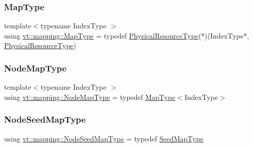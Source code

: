 \subsubsection{\texorpdfstring{Map\+Type}{MapType}}
{\footnotesize\ttfamily template$<$typename Index\+Type $>$ \\
using \hyperlink{namespacevt_1_1mapping_a443f8bb8920af5ae1d3391f61fe492a6}{vt\+::mapping\+::\+Map\+Type} = typedef \hyperlink{namespacevt_a2dc36fcada816dc6d11774d650328ee9}{Physical\+Resource\+Type}($\ast$)(Index\+Type$\ast$, \hyperlink{namespacevt_a2dc36fcada816dc6d11774d650328ee9}{Physical\+Resource\+Type})}

\mbox{\label{namespacevt_1_1mapping_a8dbe779cb3e28ed8c424bcc8826765b9}} 
\subsubsection{\texorpdfstring{Node\+Map\+Type}{NodeMapType}}
{\footnotesize\ttfamily template$<$typename Index\+Type $>$ \\
using \hyperlink{namespacevt_1_1mapping_a8dbe779cb3e28ed8c424bcc8826765b9}{vt\+::mapping\+::\+Node\+Map\+Type} = typedef \hyperlink{namespacevt_1_1mapping_a443f8bb8920af5ae1d3391f61fe492a6}{Map\+Type}$<$Index\+Type$>$}

\mbox{\label{namespacevt_1_1mapping_a84d654b657f2dbe639ada06ae688e4c7}} 
\subsubsection{\texorpdfstring{Node\+Seed\+Map\+Type}{NodeSeedMapType}}
{\footnotesize\ttfamily using \hyperlink{namespacevt_1_1mapping_a84d654b657f2dbe639ada06ae688e4c7}{vt\+::mapping\+::\+Node\+Seed\+Map\+Type} = typedef \hyperlink{namespacevt_1_1mapping_a1c1409d9af8d1ac402af022a65be4a4d}{Seed\+Map\+Type}}

\mbox{\label{namespacevt_1_1mapping_a1c1409d9af8d1ac402af022a65be4a4d}} 
